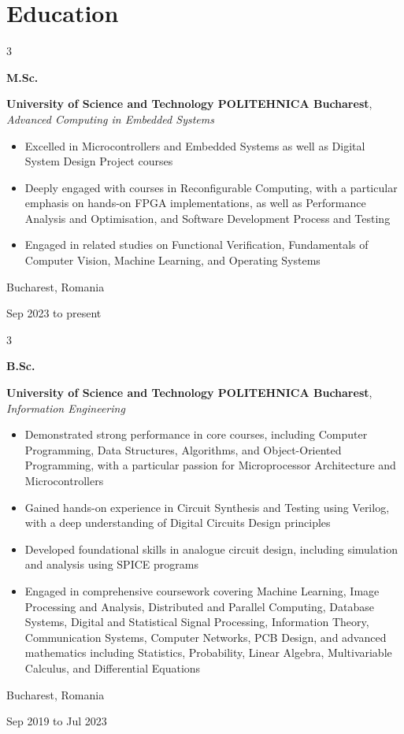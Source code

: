 \documentclass[10pt, letterpaper]{article}
\newenvironment{highlights}{
    \begin{itemize}[
        topsep=0.10 cm,
        parsep=0.10 cm,
        partopsep=0pt,
        itemsep=0pt,
        leftmargin=0.4 cm + 10pt
    ]
}{
    \end{itemize}
} %
\newenvironment{threecolentry}[3][]{
    \onecolentry
    \def\thirdColumn{#3}
    \setcolumnwidth{1 cm, \fill, 3.5 cm}
    \begin{paracol}{3}
    {\raggedright #2} \switchcolumn
}{
    \switchcolumn \raggedleft \thirdColumn
    \end{paracol}
    \endonecolentry
} %
\begin{document}
    
    \section{Education}



        
        \begin{threecolentry}{\textbf{M.Sc.}}{
            Bucharest, Romania

        Sep 2023 to present
        }
            \textbf{University of Science and Technology POLITEHNICA Bucharest}, \textit{Advanced Computing in Embedded Systems}
            \begin{highlights}
                \item Excelled in Microcontrollers and Embedded Systems as well as Digital System Design Project courses
                \item Deeply engaged with courses in Reconfigurable Computing, with a particular emphasis on hands-on FPGA implementations, as well as Performance Analysis and Optimisation, and Software Development Process and Testing
                \item Engaged in related studies on Functional Verification, Fundamentals of Computer Vision, Machine Learning, and Operating Systems
            \end{highlights}
        \end{threecolentry}

        \vspace{0.2 cm}

        \begin{threecolentry}{\textbf{B.Sc.}}{
            Bucharest, Romania

        Sep 2019 to Jul 2023
        }
            \textbf{University of Science and Technology POLITEHNICA Bucharest}, \textit{Information Engineering}
            \begin{highlights}
                \item Demonstrated strong performance in core courses, including Computer Programming, Data Structures, Algorithms, and Object-Oriented Programming, with a particular passion for Microprocessor Architecture and Microcontrollers
                \item Gained hands-on experience in Circuit Synthesis and Testing using Verilog, with a deep understanding of Digital Circuits Design principles
                \item Developed foundational skills in analogue circuit design, including simulation and analysis using SPICE programs
                \item Engaged in comprehensive coursework covering Machine Learning, Image Processing and Analysis, Distributed and Parallel Computing, Database Systems, Digital and Statistical Signal Processing, Information Theory, Communication Systems, Computer Networks, PCB Design, and advanced mathematics including Statistics, Probability, Linear Algebra, Multivariable Calculus, and Differential Equations
            \end{highlights}
        \end{threecolentry}
\end{document}
